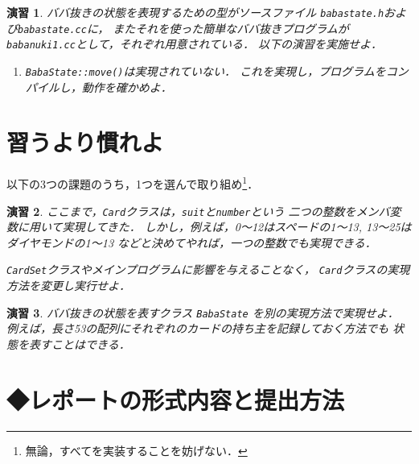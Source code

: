 \documentclass[11pt,a4,epsf]{jarticle}
\newtheorem{exerc}{演習}
\begin{document}
\begin{exerc} %
ババ抜きの状態を表現するための型がソースファイル
\verb+babastate.h+および\verb+babastate.cc+に，
またそれを使った簡単なババ抜きプログラムが
\verb+babanuki1.cc+として，それぞれ用意されている．
以下の演習を実施せよ．

\begin{enumerate}

\item[(1)] \verb+BabaState::move()+は実現されていない．
これを実現し，プログラムをコンパイルし，動作を確かめよ．

\end{enumerate}

\end{exerc} %

\section{習うより慣れよ}

以下の3つの課題のうち，1つを選んで取り組め\footnote{無論，すべてを実装することを妨げない．}．

\begin{exerc} %
ここまで，\verb+Card+クラスは，\verb+suit+と\verb+number+という
二つの整数をメンバ変数に用いて実現してきた．
しかし，例えば，0〜12はスペードの1〜13, 13〜25はダイヤモンドの1〜13
などと決めてやれば，一つの整数でも実現できる．

\verb+CardSet+クラスやメインプログラムに影響を与えることなく，
\verb+Card+クラスの実現方法を変更し実行せよ．
\end{exerc} %

\begin{exerc} %
ババ抜きの状態を表すクラス \verb+BabaState+ を別の実現方法で実現せよ．
例えば，長さ53の配列にそれぞれのカードの持ち主を記録しておく方法でも
状態を表すことはできる．
\end{exerc} %

%

\section*{◆レポートの形式内容と提出方法}
\end{document}
